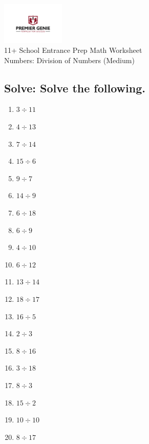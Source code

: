 \documentclass{article}
\begin{document}
\begin{center}
\includegraphics[width=3cm]{PREMGENIEJPG.jpg}\\
{\Large 11+ School Entrance Prep Math Worksheet}\\
{\Medium Numbers: Division of Numbers (Medium)}\\

\end{center}

\subsection*{Solve: Solve the following.}

\begin{enumerate}
\item $\displaystyle {3}\div{11} $ \ 
\item $\displaystyle {4}\div{13} $ \ 
\item $\displaystyle {7}\div{14} $ \ 
\item $\displaystyle {15}\div{6} $ \ 
\item $\displaystyle {9}\div{7} $ \ 
\item $\displaystyle {14}\div{9} $ \ 
\item $\displaystyle {6}\div{18} $ \ 
\item $\displaystyle {6}\div{9} $ \ 
\item $\displaystyle {4}\div{10} $ \ 
\item $\displaystyle {6}\div{12} $ \ 
\item $\displaystyle {13}\div{14} $ \ 
\item $\displaystyle {18}\div{17} $ \ 
\item $\displaystyle {16}\div{5} $ \ 
\item $\displaystyle {2}\div{3} $ \ 
\item $\displaystyle {8}\div{16} $ \ 
\item $\displaystyle {3}\div{18} $ \ 
\item $\displaystyle {8}\div{3} $ \ 
\item $\displaystyle {15}\div{2} $ \ 
\item $\displaystyle {10}\div{10} $ \ 
\item $\displaystyle {8}\div{17} $ \ 


\end{enumerate}
\end{document}
